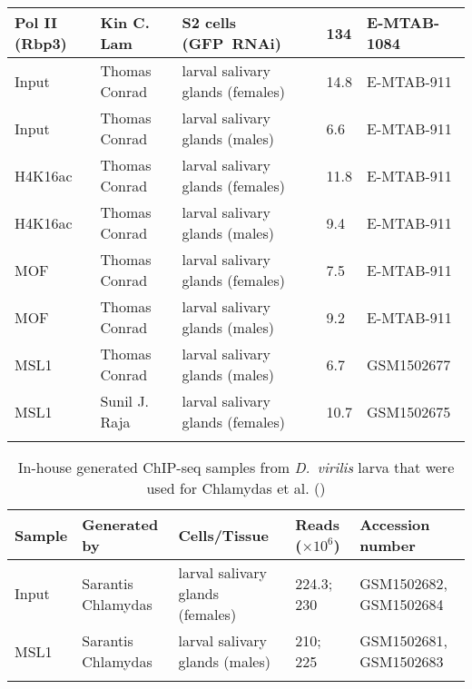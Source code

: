 \begin{singlespacing}
\begin{small}
\begin{sffamily}
\begin{longtable}[l]{p{2.3cm}p{2.5cm}p{3.5cm}p{2cm}p{3cm}}
Pol II (Rbp3) & Kin C. Lam & \raggedright S2 cells (GFP~RNAi) & 134 & E-MTAB-1084
\tabularnewline \midrule
Input & Thomas Conrad & \raggedright larval salivary glands (females) & 14.8 & E-MTAB-911 
\tabularnewline \midrule
Input & Thomas Conrad & \raggedright larval salivary glands (males) & 6.6 & E-MTAB-911 
\tabularnewline \midrule
H4K16ac & Thomas Conrad & \raggedright larval salivary glands (females) & 11.8 & E-MTAB-911
\tabularnewline \midrule
H4K16ac & Thomas Conrad & \raggedright larval salivary glands (males) & 9.4 & E-MTAB-911
\tabularnewline \midrule
MOF & Thomas Conrad & \raggedright larval salivary glands (females) & 7.5 & E-MTAB-911
\tabularnewline \midrule
MOF & Thomas Conrad & \raggedright larval salivary glands (males) & 9.2 & E-MTAB-911
\tabularnewline \midrule
MSL1 & Thomas Conrad & \raggedright larval salivary glands (males) & 6.7 & GSM1502677
\tabularnewline \midrule
MSL1 & Sunil J. Raja & \raggedright larval salivary glands (females) & 10.7 & GSM1502675
\tabularnewline \bottomrule
\label{tab:ChIPseqSamplesDmel}
\end{longtable}
%
\begin{minipage}{\textwidth}
\vspace*{-2em}
\begin{longtable}{p{1.5cm}p{3.5cm}p{3.5cm}p{2cm}p{3cm}}
\caption[In-house generated ChIP-seq samples from \textit{D.~virilis} larva that were used for Chlamydas et al.]{\textsf{In-house generated ChIP-seq samples from \textit{D.~virilis} larva that were used for Chlamydas et al. ()}} \\
\textbf{Sample} & \textbf{Generated by} & \textbf{Cells/Tissue} & \textbf{Reads ($\times 10^6$)} & \textbf{Accession number}
\tabularnewline \toprule
Input & Sarantis Chlamydas & \raggedright larval salivary glands (females) & 224.3; 230 & GSM1502682, GSM1502684
\tabularnewline \midrule
MSL1 & Sarantis Chlamydas & \raggedright larval salivary glands (males) & 210; 225 & GSM1502681, GSM1502683
\tabularnewline \bottomrule
\label{tab:ChIPseqSamplesDvir}
\end{longtable}
\end{minipage}
%
\end{sffamily}
\end{small}
\end{singlespacing}
